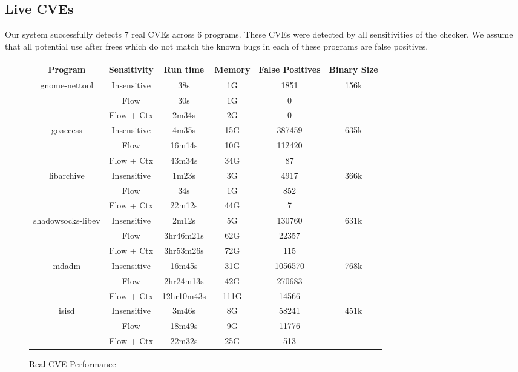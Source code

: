 \subsection{Live CVEs}
\label{alias:sec:eval:real}
Our system successfully detects 7 real CVEs across 6 programs.
These CVEs were detected by all sensitivities of the checker.
We assume that all potential use after frees which do not match the known bugs in each of these programs are false positives.

\begin{figure*}
\begin{center}
\begin{tabular}{|c|c||c|c|c|c|}
\hline
Program & Sensitivity & Run time & Memory & False Positives & Binary Size\\
\hline \hline
\multirow{3}{*}{gnome-nettool} & Insensitive & 38s & 1G & 1851 & \multirow{3}{*}{156k}\\
	& Flow & 30s & 1G & 0 &\\
	& Flow + Ctx & 2m34s & 2G & 0 &\\
	\hline
\multirow{3}{*}{goaccess} & Insensitive & 4m35s & 15G & 387459 & \multirow{3}{*}{635k}\\
	& Flow & 16m14s & 10G & 112420 &\\
	& Flow + Ctx & 43m34s & 34G & 87 &\\
	\hline
\multirow{3}{*}{libarchive} & Insensitive & 1m23s & 3G & 4917 & \multirow{3}{*}{366k}\\
	& Flow & 34s & 1G & 852 &\\
	& Flow + Ctx & 22m12s & 44G & 7 &\\
	\hline
\multirow{3}{*}{shadowsocks-libev} & Insensitive & 2m12s & 5G & 130760 & \multirow{3}{*}{631k}\\
	& Flow & 3hr46m21s & 62G & 22357 &\\
	& Flow + Ctx & 3hr53m26s & 72G & 115 &\\
	\hline
\multirow{3}{*}{mdadm} & Insensitive & 16m45s & 31G & 1056570 & \multirow{3}{*}{768k}\\
	& Flow & 2hr24m13s & 42G & 270683 &\\
	& Flow + Ctx & 12hr10m43s & 111G & 14566 &\\
	\hline
\multirow{3}{*}{isisd} & Insensitive & 3m46s & 8G & 58241 & \multirow{3}{*}{451k}\\
	& Flow & 18m49s & 9G & 11776 &\\
	& Flow + Ctx & 22m32s & 25G & 513 &\\
	\hline
\end{tabular}
\end{center}
\caption{Real CVE Performance}
\label{fig:cveperf}
\end{figure*}

